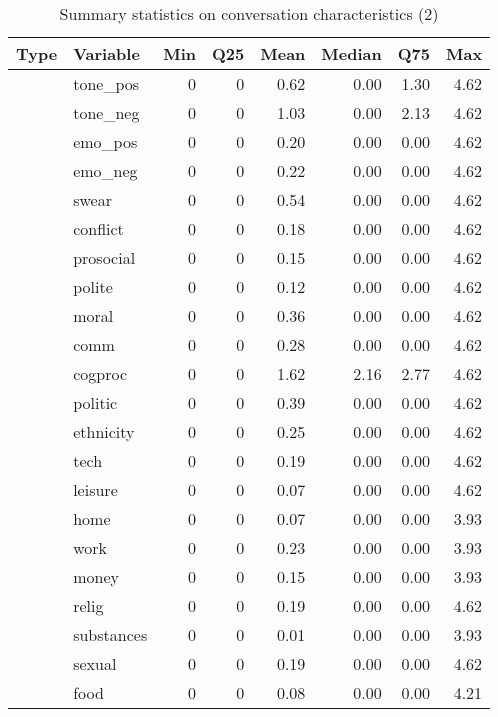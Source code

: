 \begin{table}[!h]
\centering
\caption{\label{tab:summ-tab3}Summary statistics on conversation characteristics (2)}
\centering
\begin{tabular}[t]{llrrrrrr}
\toprule
Type & Variable & Min & Q25 & Mean & Median & Q75 & Max\\
\midrule
 & tone\_pos & 0 & 0 & 0.62 & 0.00 & 1.30 & 4.62\\
\cmidrule{2-8}
 & tone\_neg & 0 & 0 & 1.03 & 0.00 & 2.13 & 4.62\\
\cmidrule{2-8}
 & emo\_pos & 0 & 0 & 0.20 & 0.00 & 0.00 & 4.62\\
\cmidrule{2-8}
 & emo\_neg & 0 & 0 & 0.22 & 0.00 & 0.00 & 4.62\\
\cmidrule{2-8}
 & swear & 0 & 0 & 0.54 & 0.00 & 0.00 & 4.62\\
\cmidrule{2-8}
 & conflict & 0 & 0 & 0.18 & 0.00 & 0.00 & 4.62\\
\cmidrule{2-8}
 & prosocial & 0 & 0 & 0.15 & 0.00 & 0.00 & 4.62\\
\cmidrule{2-8}
 & polite & 0 & 0 & 0.12 & 0.00 & 0.00 & 4.62\\
\cmidrule{2-8}
 & moral & 0 & 0 & 0.36 & 0.00 & 0.00 & 4.62\\
\cmidrule{2-8}
 & comm & 0 & 0 & 0.28 & 0.00 & 0.00 & 4.62\\
\cmidrule{2-8}
 & cogproc & 0 & 0 & 1.62 & 2.16 & 2.77 & 4.62\\
\cmidrule{2-8}
 & politic & 0 & 0 & 0.39 & 0.00 & 0.00 & 4.62\\
\cmidrule{2-8}
 & ethnicity & 0 & 0 & 0.25 & 0.00 & 0.00 & 4.62\\
\cmidrule{2-8}
 & tech & 0 & 0 & 0.19 & 0.00 & 0.00 & 4.62\\
\cmidrule{2-8}
 & leisure & 0 & 0 & 0.07 & 0.00 & 0.00 & 4.62\\
\cmidrule{2-8}
 & home & 0 & 0 & 0.07 & 0.00 & 0.00 & 3.93\\
\cmidrule{2-8}
 & work & 0 & 0 & 0.23 & 0.00 & 0.00 & 3.93\\
\cmidrule{2-8}
 & money & 0 & 0 & 0.15 & 0.00 & 0.00 & 3.93\\
\cmidrule{2-8}
 & relig & 0 & 0 & 0.19 & 0.00 & 0.00 & 4.62\\
\cmidrule{2-8}
 & substances & 0 & 0 & 0.01 & 0.00 & 0.00 & 3.93\\
\cmidrule{2-8}
 & sexual & 0 & 0 & 0.19 & 0.00 & 0.00 & 4.62\\
\cmidrule{2-8}
 & food & 0 & 0 & 0.08 & 0.00 & 0.00 & 4.21\\

\end{tabular}
\end{table}

